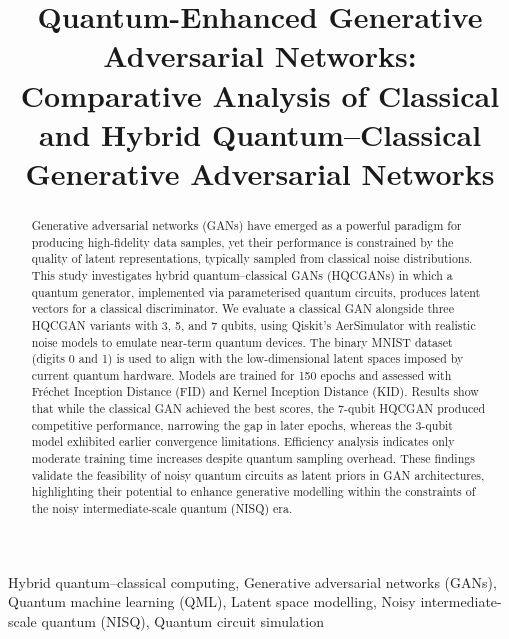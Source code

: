 \documentclass[conference]{IEEEtran}
\begin{document}
\title{Quantum-Enhanced Generative Adversarial Networks: Comparative Analysis of Classical and Hybrid Quantum–Classical Generative Adversarial Networks\\
}

\author{
}

\maketitle

\begin{abstract}
Generative adversarial networks (GANs) have emerged as a powerful paradigm for producing high-fidelity data samples, yet their performance is constrained by the quality of latent representations, typically sampled from classical noise distributions. This study investigates hybrid quantum–classical GANs (HQCGANs) in which a quantum generator, implemented via parameterised quantum circuits, produces latent vectors for a classical discriminator. We evaluate a classical GAN alongside three HQCGAN variants with 3, 5, and 7 qubits, using Qiskit’s AerSimulator with realistic noise models to emulate near-term quantum devices. The binary MNIST dataset (digits 0 and 1) is used to align with the low-dimensional latent spaces imposed by current quantum hardware. Models are trained for 150 epochs and assessed with Fréchet Inception Distance (FID) and Kernel Inception Distance (KID). Results show that while the classical GAN achieved the best scores, the 7-qubit HQCGAN produced competitive performance, narrowing the gap in later epochs, whereas the 3-qubit model exhibited earlier convergence limitations. Efficiency analysis indicates only moderate training time increases despite quantum sampling overhead. These findings validate the feasibility of noisy quantum circuits as latent priors in GAN architectures, highlighting their potential to enhance generative modelling within the constraints of the noisy intermediate-scale quantum (NISQ) era.
\end{abstract}

\begin{IEEEkeywords}
Hybrid quantum–classical computing, Generative adversarial networks (GANs), Quantum machine learning (QML), Latent space modelling, Noisy intermediate-scale quantum (NISQ), Quantum circuit simulation
\end{IEEEkeywords}
\end{document}
